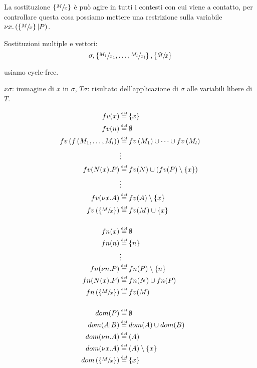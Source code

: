 \documentclass[a4paper,12pt]{article}
\theoremstyle{plain}
\theoremstyle{definition}
\theoremstyle{remark}
\newcommand{\set}[1]{\left\{#1\right\}}
\newcommand{\pa}[1]{\left(#1\right)}
\newcommand*{\eqdef}{\ensuremath{\overset{\mathclap{\text{\tiny def}}}{=}}}
\begin{document}
La sostituzione $\left\{ \sfrac{M}{x} \right\}$ \`e pu\`o agire in
tutti i contesti con cui viene a contatto, per controllare questa cosa
possiamo mettere una restrizione sulla variabile $\nu x.\left( \left\{
    \sfrac{M}{x} \right\} | P\right)$.

Sostituzioni multiple e vettori:
\[ \sigma, \left\{ \sfrac{M_1}{x_1},\dots,\sfrac{M_l}{x_l} \right\},
  \left\{ \sfrac{\tilde M}{\tilde x} \right\} \]

usiamo cycle-free.

$x\sigma$: immagine di $x$ in $\sigma$, $T\sigma$: risultato
dell'applicazione di $\sigma$ alle variabili libere di $T$.

\begin{align*}
  fv(x) & \eqdef \set{x} \\
  fv(n) & \eqdef \emptyset \\
  fv\pa{f\pa{ M_1, \dots, M_l}} & \eqdef fv\pa{M_1} \cup \cdots \cup
                                  fv\pa{M_l} \\
  & \vdots \\
  fv(N(x).P) & \eqdef fv(N) \cup \pa{fv(P) \setminus \set{x}} \\
  & \vdots \\
  fv(\nu x.A) & \eqdef fv(A) \setminus \set{x} \\
  fv\pa{ \set{ \sfrac{M}{x} } } & \eqdef fv(M) \cup \set{x}\\
  \\
  fn(x) & \eqdef \emptyset \\
  fn(n) & \eqdef \set{n} \\
  & \vdots \\
  fn(\nu n.P) & \eqdef fn(P)\setminus \set{n} \\
  fn(N(x).P) & \eqdef fn(N) \cup fn(P) \\
  fn\pa{ \set{ \sfrac{M}{x} } } & \eqdef fv(M) \\
  \\
  dom(P) & \eqdef \emptyset \\
  dom(A|B) & \eqdef dom(A) \cup dom(B) \\
  dom(\nu n.A) & \eqdef(A) \\
  dom(\nu x.A) & \eqdef(A) \setminus \set{x}\\
  dom\pa{ \set{ \sfrac{M}{x}}} & \eqdef \set{x}           
\end{align*}
\end{document}
